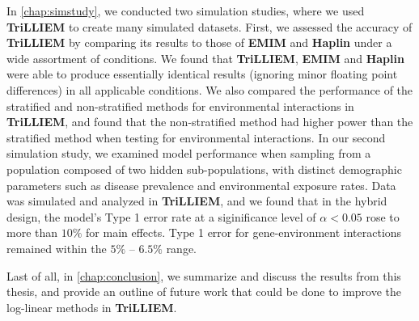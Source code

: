 In \cref{chap:simstudy}, we conducted two simulation studies, where we used \textbf{TriLLIEM} to create many simulated datasets.
First, we assessed the accuracy of \textbf{TriLLIEM} by comparing its results to those of \textbf{EMIM} and \textbf{Haplin} under a wide assortment of conditions.
We found that \textbf{TriLLIEM}, \textbf{EMIM} and \textbf{Haplin} were able to produce essentially identical results (ignoring minor floating point differences) in all applicable conditions.
We also compared the performance of the stratified and non-stratified methods for environmental interactions in \textbf{TriLLIEM}, and found that the non-stratified method had higher power than the stratified method when testing for environmental interactions.
In our second simulation study, we examined model performance when sampling from a population composed of two hidden sub-populations, with distinct demographic parameters such as disease prevalence and environmental exposure rates.
Data was simulated and analyzed in \textbf{TriLLIEM}, and we found that in the hybrid design, the model's Type 1 error rate at a siginificance level of $\alpha < 0.05$ rose to more than $10\%$ for main effects.
Type 1 error for gene-environment interactions remained within the $5\%$ -- $6.5\%$ range.

Last of all, in \cref{chap:conclusion}, we summarize and discuss the results from this thesis, and provide an outline of future work that could be done to improve the log-linear methods in \textbf{TriLLIEM}.

\vfill
\cleardoublepage


